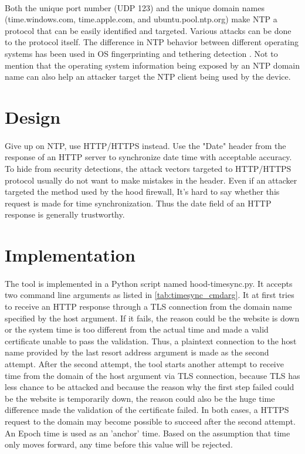 \documentclass[mscthesis]{usiinfthesis}
\begin{document}
\paragraph{}
Both the unique port number (UDP 123) and the unique domain names (time.windows.com, time.apple.com, and ubuntu.pool.ntp.org) make NTP a protocol that can be easily identified and targeted. Various attacks can be done to the protocol itself\citep{ntp:attack}. The difference in NTP behavior between different operating systems has been used in OS fingerprinting and tethering detection \citep{osandtether}. Not to mention that the operating system information being exposed by an NTP domain name can also help an attacker target the NTP client being used by the device.

\section{Design}
\paragraph{}
Give up on NTP, use HTTP/HTTPS instead. Use the "Date" header from the response of an HTTP server to synchronize date time with acceptable accuracy. To hide from security detections, the attack vectors targeted to HTTP/HTTPS protocol usually do not want to make mistakes in the header. Even if an attacker targeted the method used by the hood firewall, It's hard to say whether this request is made for time synchronization. Thus the date field of an HTTP response is generally trustworthy.

\section{Implementation}
\paragraph{}
The tool is implemented in a Python script named hood-timesync.py. It accepts two command line arguments as listed in \cref{tab:timesync_cmdarg}. It at first tries to receive an HTTP response through a TLS connection from the domain name specified by the host argument. If it fails, the reason could be the website is down or the system time is too different from the actual time and made a valid certificate unable to pass the validation. Thus, a plaintext connection to the host name provided by the last resort address argument is made as the second attempt. After the second attempt, the tool starts another attempt to receive time from the domain of the host argument via TLS connection, because TLS has less chance to be attacked and because the reason why the first step failed could be the website is temporarily down, the reason could also be the huge time difference made the validation of the certificate failed. In both cases, a HTTPS request to the domain may become possible to succeed after the second attempt. An Epoch time is used as an 'anchor' time. Based on the assumption that time only moves forward, any time before this value will be rejected.
\end{document}
